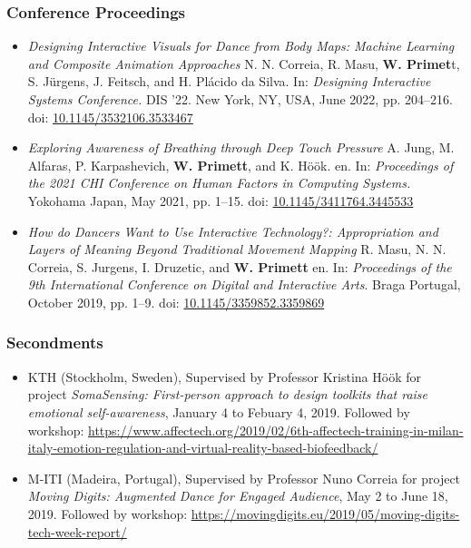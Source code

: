 \subsubsection{Conference Proceedings}
\begin{itemize}
    \item[] \textit{Designing Interactive Visuals for Dance from Body Maps: Machine Learning and
    Composite Animation Approaches}
    N. N. Correia, R. Masu, \textbf{W. Primet}t, S. Jürgens, J. Feitsch, and H. Plácido da Silva.
    In: \textit{Designing Interactive Systems Conference.}
    DIS ’22. New York, NY, USA, June 2022, pp. 204–216. doi: \url{10.1145/3532106.3533467}

    \item[] \textit{Exploring Awareness of Breathing through Deep Touch Pressure}
    A. Jung, M. Alfaras, P. Karpashevich, \textbf{W. Primett}, and K. Höök.
    en. In: \textit{Proceedings of the 2021 CHI Conference on Human Factors in Computing Systems.} Yokohama Japan, May 2021,
    pp. 1–15. doi: \url{10.1145/3411764.3445533}

    \item[] \textit{How do Dancers Want to Use Interactive Technology?: Appropriation and Layers of Meaning Beyond Traditional Movement Mapping}
    R. Masu, N. N. Correia, S. Jurgens, I. Druzetic, and \textbf{W. Primett}
    en. In: \textit{Proceedings of the 9th International Conference on Digital and Interactive Arts}. Braga Portugal, October 2019, pp. 1–9. doi: \url{10.1145/3359852.3359869}
\end{itemize}

\subsubsection{Secondments}
  \begin{itemize}
    \item[] KTH (Stockholm, Sweden), Supervised by Professor Kristina Höök for project \textit{SomaSensing: First-person approach to design toolkits that raise emotional self-awareness}, January 4 to Febuary 4, 2019. Followed by workshop: \url{https://www.affectech.org/2019/02/6th-affectech-training-in-milan-italy-emotion-regulation-and-virtual-reality-based-biofeedback/}

    \item[] M-ITI (Madeira, Portugal), Supervised by Professor Nuno Correia for project \textit{Moving Digits: Augmented Dance for Engaged Audience}, May 2 to June 18, 2019. Followed by workshop: \url{https://movingdigits.eu/2019/05/moving-digits-tech-week-report/}
  \end{itemize}

